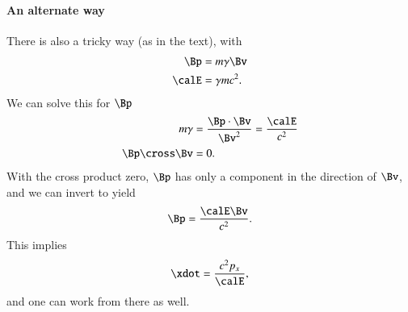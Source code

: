 {\paragraph{An alternate way}
%
There is also a tricky way (as in the text), with
%
\begin{equation}\label{eqn:relativisticElectrodynamicsT3:160}
\begin{aligned}
\Bp &= m \gamma \Bv  \\
\calE &= \gamma m c^2.
\end{aligned}
\end{equation}
%
We can solve this for \(\Bp\)
%
\begin{equation}\label{eqn:relativisticElectrodynamicsT3:1010}
\begin{aligned}
m \gamma &= \frac{\Bp \cdot \Bv}{\Bv^2} = \frac{\calE}{c^2} \\
\Bp \cross \Bv &= 0.
\end{aligned}
\end{equation}
%
With the cross product zero, \(\Bp\) has only a component in the direction of \(\Bv\), and we can invert to yield
%
\begin{equation}\label{eqn:relativisticElectrodynamicsT3:180}
\Bp = \frac{\calE \Bv}{c^2}.
\end{equation}
%
This implies
%
\begin{equation}\label{eqn:relativisticElectrodynamicsT3:200}
\xdot = \frac{c^2 p_x}{\calE},
\end{equation}
%
and one can work from there as well.

} %

